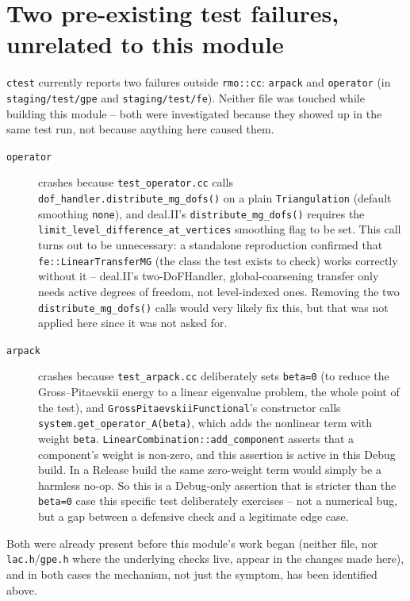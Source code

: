 \documentclass[11pt]{article}
\begin{document}
\section{Two pre-existing test failures, unrelated to this module}

\texttt{ctest} currently reports two failures outside \texttt{rmo::cc}: \texttt{arpack} and
\texttt{operator} (in \texttt{staging/test/gpe} and \texttt{staging/test/fe}). Neither file was touched
while building this module -- both were investigated because they showed up in the same
test run, not because anything here caused them.

\begin{description}
  \item[\texttt{operator}] crashes because \texttt{test\_operator.cc} calls
        \texttt{dof\_handler.distribute\_mg\_dofs()} on a plain
        \texttt{Triangulation} (default smoothing \texttt{none}), and deal.II's
        \texttt{distribute\_mg\_dofs()} requires the
        \texttt{limit\_level\_difference\_at\_vertices} smoothing flag to be set. This call
        turns out to be unnecessary: a standalone reproduction confirmed that
        \texttt{fe::LinearTransferMG} (the class the test exists to check) works correctly
        without it -- deal.II's two-DoFHandler, global-coarsening transfer only needs
        active degrees of freedom, not level-indexed ones. Removing the two
        \texttt{distribute\_mg\_dofs()} calls would very likely fix this, but that was not
        applied here since it was not asked for.
  \item[\texttt{arpack}] crashes because \texttt{test\_arpack.cc} deliberately sets
        \texttt{beta=0} (to reduce the Gross--Pitaevskii energy to a linear eigenvalue
        problem, the whole point of the test), and
        \texttt{GrossPitaevskiiFunctional}'s constructor calls
        \texttt{system.get\_operator\_A(beta)}, which adds the nonlinear term with weight
        \texttt{beta}. \texttt{LinearCombination::add\_component} asserts that a
        component's weight is non-zero, and this assertion is active in this Debug build.
        In a Release build the same zero-weight term would simply be a harmless no-op. So
        this is a Debug-only assertion that is stricter than the \texttt{beta=0} case this
        specific test deliberately exercises -- not a numerical bug, but a gap between a
        defensive check and a legitimate edge case.
\end{description}

Both were already present before this module's work began (neither file, nor
\texttt{lac.h}/\texttt{gpe.h} where the underlying checks live, appear in the changes made
here), and in both cases the mechanism, not just the symptom, has been identified above.
\end{document}
